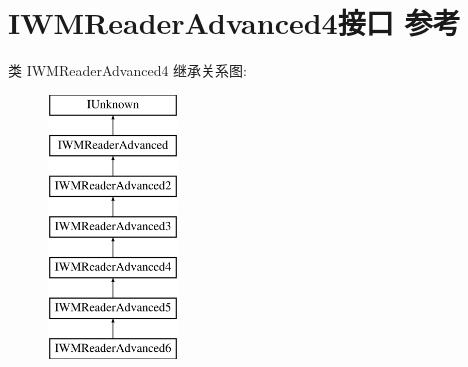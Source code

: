 \hypertarget{interface_i_w_m_reader_advanced4}{}\section{I\+W\+M\+Reader\+Advanced4接口 参考}
\label{interface_i_w_m_reader_advanced4}
类 I\+W\+M\+Reader\+Advanced4 继承关系图\+:\begin{figure}[H]
\begin{center}
\leavevmode
\includegraphics[height=7.000000cm]{interface_i_w_m_reader_advanced4}
\end{center}
\end{figure}
